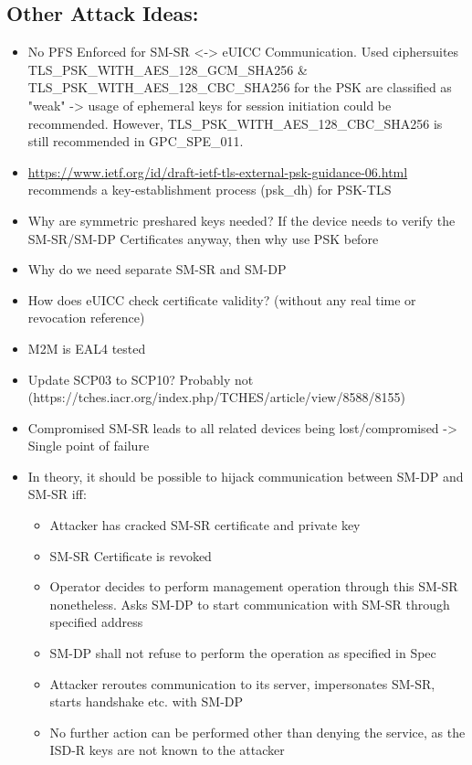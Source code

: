 \subsection{Other Attack Ideas:}
\begin{itemize}
    \item No PFS Enforced for SM-SR <-> eUICC Communication. Used ciphersuites TLS\_PSK\_WITH\_AES\_128\_GCM\_SHA256 \& TLS\_PSK\_WITH\_AES\_128\_CBC\_SHA256 for the PSK are classified as "weak" -> usage of ephemeral keys for session initiation could be recommended. However, TLS\_PSK\_WITH\_AES\_128\_CBC\_SHA256 is still recommended in GPC\_SPE\_011.
    \item \url{https://www.ietf.org/id/draft-ietf-tls-external-psk-guidance-06.html} recommends a key-establishment process (psk\_dh) for PSK-TLS
	\item Why are symmetric preshared keys needed? If the device needs to verify the SM-SR/SM-DP Certificates anyway, then why use PSK before
    \item Why do we need separate SM-SR and SM-DP
    \item How does eUICC check certificate validity? (without any real time or revocation reference)
    \item M2M is EAL4 tested
    \item Update SCP03 to SCP10? Probably not (https://tches.iacr.org/index.php/TCHES/article/view/8588/8155)
    \item Compromised SM-SR leads to all related devices being lost/compromised -> Single point of failure
    \item In theory, it should be possible to hijack communication between SM-DP and SM-SR iff:
    \begin{itemize}
        \item Attacker has cracked SM-SR certificate and private key
        \item SM-SR Certificate is revoked
        \item Operator decides to perform management operation through this SM-SR nonetheless. Asks SM-DP to start communication with SM-SR through specified address
        \item SM-DP shall not refuse to perform the operation as specified in Spec
        \item Attacker reroutes communication to its server, impersonates SM-SR, starts handshake etc. with SM-DP
        \item No further action can be performed other than denying the service, as the ISD-R keys are not known to the attacker 
    \end{itemize}
\end{itemize}



